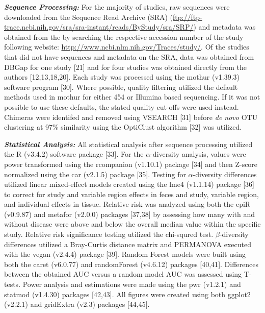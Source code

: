 \documentclass[12pt,]{article}
\begin{document}
\textbf{\emph{Sequence Processing:}} For the majority of studies, raw
sequences were downloaded from the Sequence Read Archive (SRA)
(\url{ftp://ftp-trace.ncbi.nih.gov/sra/sra-instant/reads/ByStudy/sra/SRP/})
and metadata was obtained from the by searching the respective accession
number of the study following website:
\url{http://www.ncbi.nlm.nih.gov/Traces/study/}. Of the studies that did
not have sequences and metadata on the SRA, data was obtained from DBGap
for one study {[}21{]} and for four studies was obtained directly from
the authors {[}12,13,18,20{]}. Each study was processed using the mothur
(v1.39.3) software program {[}30{]}. Where possible, quality filtering
utilized the default methods used in mothur for either 454 or Illumina
based sequencing. If it was not possible to use these defaults, the
stated quality cut-offs were used instead. Chimeras were identifed and
removed using VSEARCH {[}31{]} before \emph{de novo} OTU clustering at
97\% similarity using the OptiClust algorithm {[}32{]} was utilized.

\textbf{\emph{Statistical Analysis:}} All statistical analysis after
sequence processing utilized the R (v3.4.2) software package {[}33{]}.
For the \(\alpha\)-diversity analysis, values were power transformed
using the rcompanion (v1.10.1) package {[}34{]} and then Z-score
normalized using the car (v2.1.5) package {[}35{]}. Testing for
\(\alpha\)-diversity differences utilized linear mixed-effect models
created using the lme4 (v1.1.14) package {[}36{]} to correct for study
and variable region effects in feces and study, variable region, and
individual effects in tissue. Relative risk was analyzed using both the
epiR (v0.9.87) and metafor (v2.0.0) packages {[}37,38{]} by assessing
how many with and without disease were above and below the overall
median value within the specific study. Relative risk significance
testing utilized the chi-squred test. \(\beta\)-diversity differences
utilized a Bray-Curtis distance matrix and PERMANOVA executed with the
vegan (v2.4.4) package {[}39{]}. Random Forest models were built using
both the caret (v6.0.77) and randomForest (v4.6.12) packages
{[}40,41{]}. Differences between the obtained AUC versus a random model
AUC was assessed using T-tests. Power analysis and estimations were made
using the pwr (v1.2.1) and statmod (v1.4.30) packages {[}42,43{]}. All
figures were created using both ggplot2 (v2.2.1) and gridExtra (v2.3)
packages {[}44,45{]}.
\end{document}
